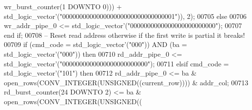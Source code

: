 \begin{DoxyCode}
{      wr_burst_counter}\textcolor{vhdlchar}{(}\textcolor{vhdllogic}{}\textcolor{vhdllogic}{1} \textcolor{keywordflow}{DOWNTO} \textcolor{vhdllogic}{}\textcolor{vhdllogic}{0}\textcolor{vhdlchar}{)}\textcolor{vhdlchar}{)}\textcolor{vhdlchar}{)} \textcolor{vhdlchar}{+} \textcolor{comment}{std\_logic\_vector}\textcolor{vhdlchar}{'}\textcolor{vhdlchar}{(}\textcolor{vhdllogic}{"000000000000000000000000000000001"}\textcolor{vhdlchar}{)}\textcolor{vhdlchar}{)}\textcolor{vhdlchar}{,} \textcolor{vhdllogic}{}\textcolor{vhdllogic}{2}\textcolor{vhdlchar}{)};
00705       \textcolor{keywordflow}{else}
00706         \textcolor{vhdlchar}{wr_addr_pipe_0} \textcolor{vhdlchar}{<=} \textcolor{comment}{std\_logic\_vector}\textcolor{vhdlchar}{'}\textcolor{vhdlchar}{(}\textcolor{vhdllogic}{"0000000000000000000000000"}\textcolor{vhdlchar}{)};
00707       \textcolor{keywordflow}{end} \textcolor{keywordflow}{if};
00708 \textcolor{keyword}{      -- Reset read address otherwise if the first write is partial it breaks!}
00709       \textcolor{keywordflow}{if} \textcolor{vhdlchar}{(}\textcolor{vhdlchar}{cmd_code} \textcolor{vhdlchar}{=} \textcolor{comment}{std\_logic\_vector}\textcolor{vhdlchar}{'}\textcolor{vhdlchar}{(}\textcolor{vhdllogic}{"000"}\textcolor{vhdlchar}{)}\textcolor{vhdlchar}{)} \textcolor{keywordflow}{AND} \textcolor{vhdlchar}{(}\textcolor{vhdlchar}{ba} \textcolor{vhdlchar}{=} \textcolor{comment}{std\_logic\_vector}\textcolor{vhdlchar}{'}\textcolor{vhdlchar}{(}\textcolor{vhdllogic}{"000"}\textcolor{vhdlchar}{)}\textcolor{vhdlchar}{)} \textcolor{keywordflow}{then} 
00710         \textcolor{vhdlchar}{rd_addr_pipe_0} \textcolor{vhdlchar}{<=} \textcolor{comment}{std\_logic\_vector}\textcolor{vhdlchar}{'}\textcolor{vhdlchar}{(}\textcolor{vhdllogic}{"0000000000000000000000000"}\textcolor{vhdlchar}{)};
00711       \textcolor{keywordflow}{elsif} \textcolor{vhdlchar}{cmd_code} \textcolor{vhdlchar}{=} \textcolor{comment}{std\_logic\_vector}\textcolor{vhdlchar}{'}\textcolor{vhdlchar}{(}\textcolor{vhdllogic}{"101"}\textcolor{vhdlchar}{)} \textcolor{keywordflow}{then} 
00712         \textcolor{vhdlchar}{rd_addr_pipe_0} \textcolor{vhdlchar}{<=} \textcolor{vhdlchar}{ba} \textcolor{vhdlchar}{&} \textcolor{vhdlchar}{open_rows}\textcolor{vhdlchar}{(}\textcolor{vhdlchar}{CONV\_INTEGER}\textcolor{vhdlchar}{(}\textcolor{comment}{UNSIGNED}\textcolor{vhdlchar}{(}\textcolor{vhdlchar}{(}\textcolor{vhdlchar}{current_row}\textcolor{vhdlchar}{)}\textcolor{vhdlchar}{)}\textcolor{vhdlchar}{)}\textcolor{vhdlchar}{)} \textcolor{vhdlchar}{&} \textcolor{vhdlchar}{
      addr_col};
00713         \textcolor{vhdlchar}{rd_burst_counter}\textcolor{vhdlchar}{(}\textcolor{vhdllogic}{}\textcolor{vhdllogic}{24} \textcolor{keywordflow}{DOWNTO} \textcolor{vhdllogic}{}\textcolor{vhdllogic}{2}\textcolor{vhdlchar}{)} \textcolor{vhdlchar}{<=} \textcolor{vhdlchar}{ba} \textcolor{vhdlchar}{&} \textcolor{vhdlchar}{open_rows}\textcolor{vhdlchar}{(}\textcolor{vhdlchar}{CONV\_INTEGER}\textcolor{vhdlchar}{(}\textcolor{comment}{UNSIGNED}\textcolor{vhdlchar}{(}\textcolor{vhdlchar}{(}\textcolor{vhdlchar}{
}
\end{DoxyCode}
